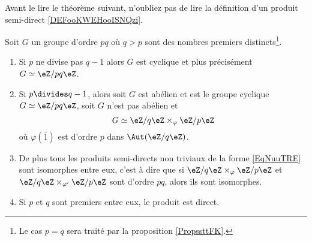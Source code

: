 Avant le lire le théorème suivant, n'oubliez pas de lire la définition d'un produit semi-direct \ref{DEFooKWEHooISNQzi}.
\begin{theorem} \label{ThoLnTMBy}
    Soit \( G\) un groupe d'ordre \( pq\) où \( q>p\) sont des nombres premiers distincts\footnote{Le cas \( p=q\) sera traité par la proposition \ref{PropssttFK}.}. 
    \begin{enumerate}
        \item
    Si \( p\) ne divise pas \( q-1\) alors \( G\) est cyclique et plus précisément \( G\simeq \eZ/pq\eZ\).
\item

    Si \( p\divides q-1\), alors soit \( G\) est abélien et est le groupe cyclique \( G\simeq \eZ/pq\eZ\), soit \( G\) n'est pas abélien et
    \begin{equation}    \label{EqNuuTRE}
        G\simeq \eZ/q\eZ\times_{\varphi}\eZ/p\eZ
    \end{equation}
    où \( \varphi(\bar 1)\) est d'ordre \( p\) dans \( \Aut(\eZ/q\eZ)\).
\item

    De plus tous les produits semi-directs non triviaux de la forme \eqref{EqNuuTRE} sont isomorphes entre eux, c'est à dire que si \( \eZ/q\eZ\times_{\varphi}\eZ/p\eZ\) et \( \eZ/q\eZ\times_{\varphi'}\eZ/p\eZ\) sont d'ordre \( pq\), alors ils sont isomorphes.

\item

    Si \( p\) et \( q\) sont premiers entre eux, le produit est direct.
    \end{enumerate}
\end{theorem}

